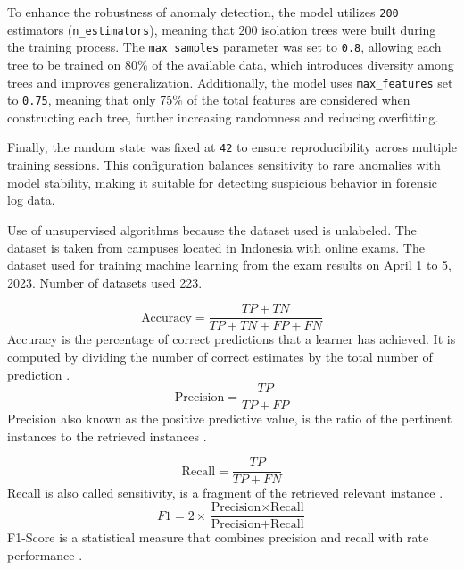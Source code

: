 To enhance the robustness of anomaly detection, the model utilizes \texttt{200} estimators (\texttt{n\_estimators}), meaning that 200 isolation trees were built during the training process. The \texttt{max\_samples} parameter was set to \texttt{0.8}, allowing each tree to be trained on 80\% of the available data, which introduces diversity among trees and improves generalization. Additionally, the model uses \texttt{max\_features} set to \texttt{0.75}, meaning that only 75\% of the total features are considered when constructing each tree, further increasing randomness and reducing overfitting.

Finally, the random state was fixed at \texttt{42} to ensure reproducibility across multiple training sessions. This configuration balances sensitivity to rare anomalies with model stability, making it suitable for detecting suspicious behavior in forensic log data.


Use of unsupervised algorithms because the dataset used is unlabeled. The dataset is taken from campuses located in Indonesia with online exams. The dataset used for training machine learning from the exam results on April 1 to 5, 2023. Number of datasets used 223.

\begin{equation}
	\text{Accuracy} = \frac{TP + TN}{TP + TN + FP + FN}
\end{equation}
Accuracy is the percentage of correct predictions that a learner has achieved. It is computed by dividing the number of correct estimates by the total number of prediction \citet{smirani2022algorithm}.
\begin{equation}
	\text{Precision} = \frac{TP}{TP + FP}
\end{equation}
Precision also known as the positive predictive value, is the ratio of the pertinent instances to the retrieved instances \citet{smirani2022algorithm}.

\begin{equation}
	\text{Recall} = \frac{TP}{TP + FN}
\end{equation}
Recall is also called sensitivity, is a fragment of the retrieved relevant instance \citet{smirani2022algorithm}.
\begin{equation}
	F1 = 2 \times \frac{\text{Precision} \times \text{Recall}}{\text{Precision} + \text{Recall}}
\end{equation}
F1-Score is a statistical measure that combines precision and recall with rate performance \citet{smirani2022algorithm}.

